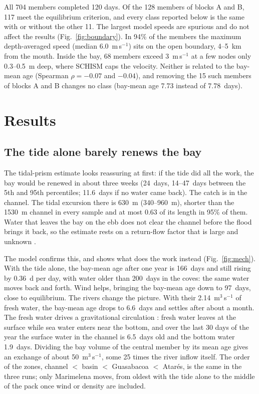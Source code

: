 \documentclass[a4paper,fleqn]{ems-dc}
\begin{document}
All 704 members completed 120 days. Of the 128 members of blocks A and B, 117 meet the
equilibrium criterion, and every class reported below is the same with or without the other
11. The largest model speeds are spurious and do not affect the results
(Fig.~\ref{fig:boundary}). In 94\% of the members the maximum depth-averaged speed (median
6.0~m\,s$^{-1}$) sits on the open boundary, 4--5~km from the mouth. Inside the bay, 68 members
exceed 3~m\,s$^{-1}$ at a few nodes only 0.3--0.5~m deep, where SCHISM caps the velocity.
Neither is related to the bay-mean age (Spearman $\rho = -0.07$ and $-0.04$), and removing the
15 such members of blocks A and B changes no class (bay-mean age 7.73 instead of 7.78~days).

\section{Results}\label{sec:results}
\subsection{The tide alone barely renews the bay}\label{sec:res-mech}
The tidal-prism estimate looks reassuring at first: if the tide did all the work, the bay
would be renewed in about three weeks (24~days, 14--47~days between the 5th and 95th
percentiles; 11.6~days if no water came back). The catch is in the channel. The tidal
excursion there is 630~m (340--960~m), shorter than the 1530~m channel in every sample and at
most 0.63 of its length in 95\% of them. Water that leaves the bay on the ebb does not clear
the channel before the flood brings it back, so the estimate rests on a return-flow factor
that is large and unknown \citep{Sanford1992}.

The model confirms this, and shows what does the work instead (Fig.~\ref{fig:mech}). With the
tide alone, the bay-mean age after one year is 166~days and still rising by 0.36~d per day,
with water older than 200~days in the coves: the same water moves back and forth. Wind
helps, bringing the bay-mean age down to 97~days, close to equilibrium. The rivers change the
picture. With their 2.14~m$^3$\,s$^{-1}$ of fresh water, the bay-mean age drops to
6.6~days and settles after about a month. The fresh water drives a gravitational
circulation \citep{Hansen1965,MacCready2010,Geyer2014}: fresh water leaves at the surface
while sea water enters near the bottom, and over the last 30 days of the year the surface
water in the channel is 6.5~days old and the bottom water 1.9~days. Dividing the bay volume
of the central member by its mean age gives an exchange of about 50~m$^3$\,s$^{-1}$, some
25 times the river inflow itself.
The order of the zones, channel $<$ basin $<$ Guasabacoa $<$ Atar\'es, is the same in the
three runs; only Marimelena moves, from oldest with the tide alone to the middle of the pack
once wind or density are included.
\end{document}
